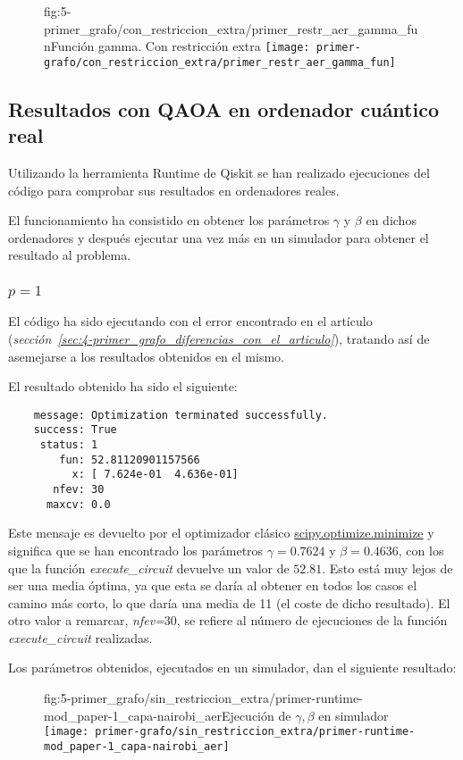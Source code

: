 \begin{figure}[htbp]{fig:5-primer_grafo/con_restriccion_extra/primer_restr_aer_gamma_fun}{Función gamma. Con restricción extra}
  \centering
  \texttt{[image: primer-grafo/con\_restriccion\_extra/primer\_restr\_aer\_gamma\_fun]}
\end{figure}

\subsection{Resultados con QAOA en ordenador cuántico real}
Utilizando la herramienta Runtime de Qiskit se han realizado ejecuciones del código para comprobar sus resultados en ordenadores reales.

El funcionamiento ha consistido en obtener los parámetros $\gamma$ y $\beta$ en dichos ordenadores y después ejecutar una vez más en un simulador para obtener el resultado al problema.

\subsubsection{\(p = 1\)}
El código ha sido ejecutando con el error encontrado en el artículo (\textit{sección~\ref{sec:4-primer_grafo_diferencias_con_el_articulo}}), tratando así de asemejarse a los resultados obtenidos en el mismo.

El resultado obtenido ha sido el siguiente:

\begin{verbatim}
    message: Optimization terminated successfully.
    success: True
     status: 1
        fun: 52.81120901157566
          x: [ 7.624e-01  4.636e-01]
       nfev: 30
      maxcv: 0.0
\end{verbatim}

Este mensaje es devuelto por el optimizador clásico \href{https://docs.scipy.org/doc/scipy/reference/generated/scipy.optimize.minimize.html}{scipy.optimize.minimize}
y significa que se han encontrado los parámetros $\gamma = 0.7624$ y $\beta = 0.4636$, con los que la función \textit{execute\_circuit} devuelve un valor de $52.81$. Esto está muy lejos de ser una media óptima, ya que esta se daría al obtener en todos los casos el camino más corto, lo que daría una media de 11 (el coste de dicho resultado).
El otro valor a remarcar, \textit{nfev=$30$}, se refiere al número de ejecuciones de la función \textit{execute\_circuit} realizadas.

Los parámetros obtenidos, ejecutados en un simulador, dan el siguiente resultado:
\begin{figure}[htbp]{fig:5-primer_grafo/sin_restriccion_extra/primer-runtime-mod_paper-1_capa-nairobi_aer}{Ejecución de $\gamma, \beta$ en simulador}
  \centering
  \texttt{[image: primer-grafo/sin\_restriccion\_extra/primer-runtime-mod\_paper-1\_capa-nairobi\_aer]}
\end{figure}

